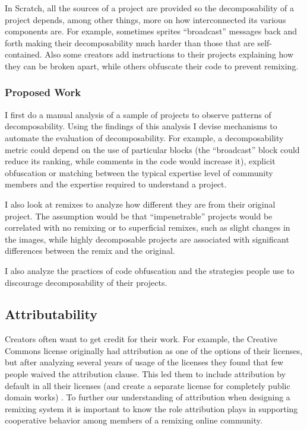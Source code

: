 In Scratch, all the sources of a project are provided so the decomposability of a project depends, among other things, more on how interconnected its various components are. 
For example, sometimes sprites ``broadcast'' messages back and forth making their decomposability much harder than those that are self-contained.
Also some creators add instructions to their projects explaining how they can be broken apart, while others obfuscate their code to prevent remixing.

\subsubsection{Proposed Work}
I first do a manual analysis of a sample of projects to observe patterns of decomposability. 
Using the findings of this analysis I devise mechanisms to automate the evaluation of decomposability. 
For example, a decomposability metric could depend on the use of particular blocks (the ``broadcast'' block could reduce its ranking, while comments in the code would increase it), explicit obfuscation or matching between the typical expertise level of community members and the expertise required to understand a project.

I also look at remixes to analyze how different they are from their original project. 
The assumption would be that ``impenetrable'' projects would be correlated with no remixing or to superficial remixes, such as slight changes in the images, while highly decomposable projects are associated with significant differences between the remix and the original.

I also analyze the practices of code obfuscation and the strategies people use to discourage decomposability of their projects.

\subsection{Attributability}
Creators often want to get credit for their work. 
For example, the Creative Commons license originally had attribution as one of the options of their licenses, but after analyzing several years of usage of the licenses they found that few people waived the attribution clause. 
This led them to include attribution by default in all their licenses (and create a separate license for completely public domain works) \citep{brown_announcing_2004}.
To further our understanding of attribution when designing a remixing system it is important to know the role attribution plays in supporting cooperative behavior among members of a remixing online community.

